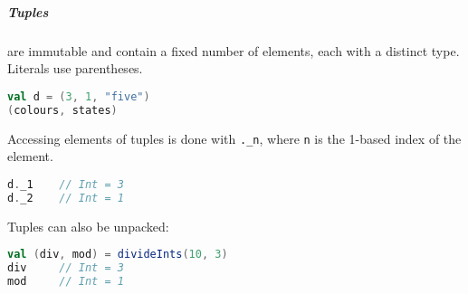 \subparagraph{Tuples} are immutable and contain a fixed number of elements, each with a distinct type. Literals use parentheses.
\begin{lstlisting}[language=scala, style=snippet]
val d = (3, 1, "five")
(colours, states)
\end{lstlisting}
Accessing elements of tuples is done with \texttt{.\_n}, where \texttt{n} is the 1-based index of the element.
\begin{lstlisting}[language=scala, style=snippet]
d._1    // Int = 3
d._2    // Int = 1
\end{lstlisting}
Tuples can also be unpacked:
\begin{lstlisting}[language=scala, style=snippet]
val (div, mod) = divideInts(10, 3)
div     // Int = 3
mod     // Int = 1
\end{lstlisting}

